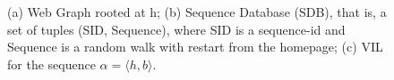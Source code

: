 \begin{figure}[tb]
  \centering
  \centering
  \caption{(a) Web Graph rooted at h; (b) Sequence Database (SDB), that is, a set of tuples (SID, Sequence), where SID is a sequence-id and Sequence is a random walk with restart from the homepage; (c) VIL for the sequence $\alpha = \langle h,b \rangle$.}
  \label{fig:myfigs}
\end{figure}
